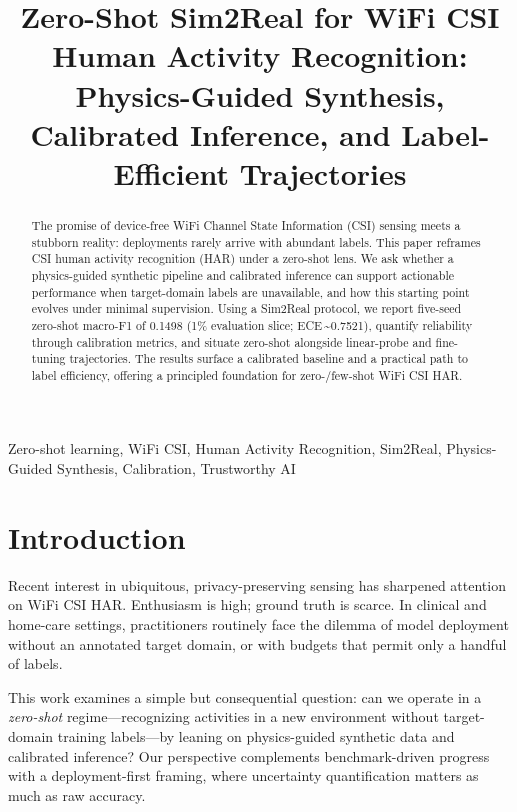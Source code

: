 \documentclass[journal]{IEEEtran}
\begin{document}
\title{Zero-Shot Sim2Real for WiFi CSI Human Activity Recognition: Physics-Guided Synthesis, Calibrated Inference, and Label-Efficient Trajectories}

\author{
}

\maketitle

\begin{abstract}
The promise of device-free WiFi Channel State Information (CSI) sensing meets a stubborn reality: deployments rarely arrive with abundant labels. This paper reframes CSI human activity recognition (HAR) under a zero-shot lens. We ask whether a physics-guided synthetic pipeline and calibrated inference can support actionable performance when target-domain labels are unavailable, and how this starting point evolves under minimal supervision. Using a Sim2Real protocol, we report five-seed zero-shot macro-F1 of 0.1498 (1\% evaluation slice; ECE\,\textasciitilde0.7521), quantify reliability through calibration metrics, and situate zero-shot alongside linear-probe and fine-tuning trajectories. The results surface a calibrated baseline and a practical path to label efficiency, offering a principled foundation for zero-/few-shot WiFi CSI HAR.
\end{abstract}

\begin{IEEEkeywords}
Zero-shot learning, WiFi CSI, Human Activity Recognition, Sim2Real, Physics-Guided Synthesis, Calibration, Trustworthy AI
\end{IEEEkeywords}

\section{Introduction}
Recent interest in ubiquitous, privacy-preserving sensing has sharpened attention on WiFi CSI HAR. Enthusiasm is high; ground truth is scarce. In clinical and home-care settings, practitioners routinely face the dilemma of model deployment without an annotated target domain, or with budgets that permit only a handful of labels.

This work examines a simple but consequential question: can we operate in a \emph{zero-shot} regime—recognizing activities in a new environment without target-domain training labels—by leaning on physics-guided synthetic data and calibrated inference? Our perspective complements benchmark-driven progress~\cite{yang2023sensefi} with a deployment-first framing, where uncertainty quantification matters as much as raw accuracy.
\end{document}
